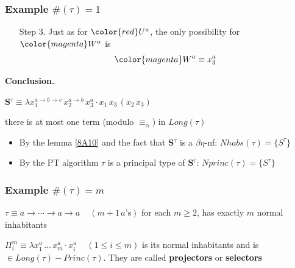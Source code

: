 \begin{frame}
 \frametitle{Example $\#(\tau) = 1$}
\begin{itemize}
 \item[Step 3.] Just as for ${\color{red}U^a}$, the only possibility for ${\color{magenta}W^a}$ is\\[0.3cm]
\begin{equation}
  {\color{magenta}W^a} \equiv x_3^a
\end{equation}
\end{itemize}

\textbf{Conclusion.}

\begin{block}{\begin{center}
               \textbf{S}$^{\tau} \equiv \lambda x_1^{a \to b \to c}\,x_2^{a \to b}\,x_3^a\cdot x_1\,x_3\,(x_2\,x_3)$
              \end{center}}
\begin{center}
there is at most one term (modulo $\equiv_{\alpha}$) in $Long(\tau)$
\end{center}
\end{block}
\begin{itemize}
 \item By the lemma \ref{8A10} and the fact that \textbf{S}$^{\tau}$ is a $\beta\eta$-nf:
 $Nhabs(\tau) = \{S^{\tau}\}$
 \item By the PT algorithm $\tau$ is a principal type of \textbf{S}$^{\tau}$: 
 $Nprinc(\tau) = \{S^{\tau}\}$ 
\end{itemize}

\end{frame}


\begin{frame}
\frametitle{Example $\#(\tau) = m$}
\begin{block}{ $\tau \equiv a \to \cdots \to a \to a\,\,\,\,\,\,\, (m+1 \,a\mbox{'s})$}
for each $m \geq 2$, has exactly $m$ normal inhabitants
\end{block}
\begin{block}{$\Pi^m_i \equiv \lambda x_1^a\,...\,x_m^a\cdot x_i^a\,\,\,\,\,\,\,(1 \leq i \leq m)$}
is its normal inhabitants and is $\in Long(\tau) - Princ(\tau)$. They are called \textbf{projectors} or \textbf{selectors}
\end{block}
 
\end{frame}


